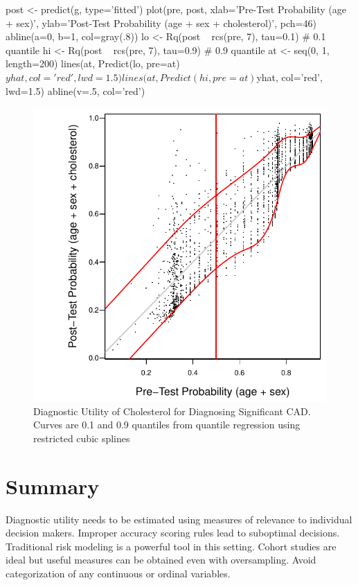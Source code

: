 \begin{Schunk}
\begin{Sinput}
post <- predict(g, type='fitted')
plot(pre, post, xlab='Pre-Test Probability (age + sex)',
     ylab='Post-Test Probability (age + sex + cholesterol)', pch=46)
abline(a=0, b=1, col=gray(.8))
lo <- Rq(post ~ rcs(pre, 7), tau=0.1)  # 0.1 quantile
hi <- Rq(post ~ rcs(pre, 7), tau=0.9)  # 0.9 quantile
at <- seq(0, 1, length=200)
lines(at, Predict(lo, pre=at)$yhat, col='red', lwd=1.5)
lines(at, Predict(hi, pre=at)$yhat, col='red', lwd=1.5)
abline(v=.5, col='red')
\end{Sinput}
\begin{figure}[htbp]

\centerline{\includegraphics{dx-du-acath-1} }

\caption[Diagnostic Utility of Cholesterol for Diagnosing Significant CAD]{Diagnostic Utility of Cholesterol for Diagnosing Significant CAD.  Curves are 0.1 and 0.9 quantiles from quantile regression using restricted cubic splines}\label{fig:dx-du-acath}
\end{figure}
\end{Schunk}

\section{Summary}
{\smaller Diagnostic utility needs to be estimated using measures of
relevance to individual decision makers.  Improper accuracy scoring rules lead to suboptimal decisions.  Traditional risk modeling is a powerful tool in this setting.  Cohort studies are ideal but useful measures can be obtained
even with oversampling.  Avoid categorization of any continuous or ordinal variables.}
